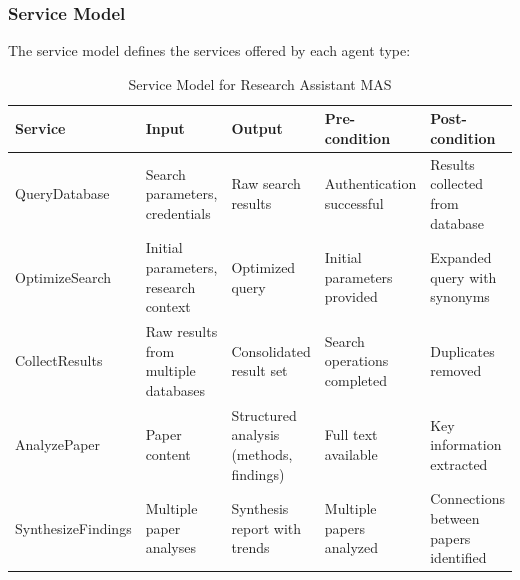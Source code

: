 \documentclass[11pt,a4paper]{article}
\begin{document}
\subsubsection{Service Model}
The service model defines the services offered by each agent type:

\begin{table}[H]
    \centering
    \begin{tabular}{|p{2.5cm}|p{3cm}|p{2.5cm}|p{3cm}|p{3cm}|}
    \hline
    \textbf{Service} & \textbf{Input} & \textbf{Output} & \textbf{Pre-condition} & \textbf{Post-condition} \\
    \hline
    QueryDatabase & Search parameters, credentials & Raw search results & Authentication successful & Results collected from database \\
    \hline
    OptimizeSearch & Initial parameters, research context & Optimized query & Initial parameters provided & Expanded query with synonyms \\
    \hline
    CollectResults & Raw results from multiple databases & Consolidated result set & Search operations completed & Duplicates removed \\
    \hline
    AnalyzePaper & Paper content & Structured analysis (methods, findings) & Full text available & Key information extracted \\
    \hline
    SynthesizeFindings & Multiple paper analyses & Synthesis report with trends & Multiple papers analyzed & Connections between papers identified \\
    \hline
    \end{tabular}
    \caption{Service Model for Research Assistant MAS}
    \label{tab:service-model}
\end{table}
\end{document}
